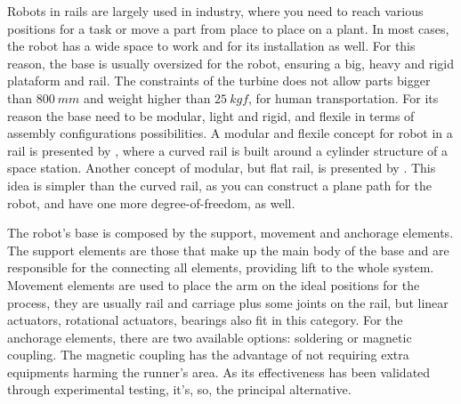 Robots in rails are largely used in industry, where you need to reach various
positions for a task or move a part from place to place on a plant.
In most cases, the robot has a wide space to work and for its installation as
well. For this reason, the base is usually oversized for the robot, ensuring a
big, heavy and rigid plataform and rail. The constraints of the turbine does not
allow parts bigger than $800~mm$ and weight higher than $25~kgf$, for human
transportation.
For its reason the base need to be modular, light and rigid, and flexile in
terms of assembly configurations possibilities.
A modular and flexile concept for robot in a rail is presented by
\cite{Chen2012}, where a curved rail is built around a cylinder structure of a
space station.
Another concept of modular, but flat rail, is presented by \cite{Moon2015}. This
idea is simpler than the curved rail, as you can construct a plane path for the
robot, and have one more degree-of-freedom, as well.

The robot's base is composed by the support, movement and anchorage elements.
The support elements are those that make up the main body of the base and are
responsible for the connecting all elements, providing lift to the whole system.
Movement elements are used to place the arm on the ideal positions for the
process, they  are usually rail and carriage plus some joints on the rail, but
linear actuators, rotational actuators, bearings also fit in this category. For
the anchorage elements, there are two available options: soldering or magnetic
coupling. The magnetic coupling has the advantage of not requiring extra
equipments harming the runner's area. As its effectiveness has been
validated through experimental testing, it's, so, the principal alternative.







